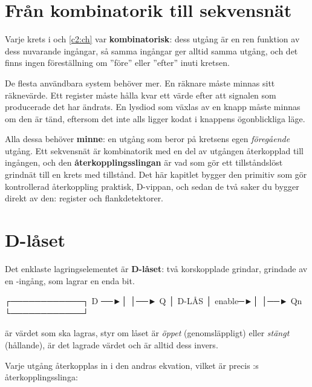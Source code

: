 
\section{Från kombinatorik till sekvensnät}
\label{c3:sec:seq}

Varje krets i  och \ref{c2:ch} var \textbf{kombinatorisk}: dess utgång är en ren
funktion av dess nuvarande ingångar, så samma ingångar ger alltid samma utgång, och det finns
ingen föreställning om ”före” eller ”efter” inuti kretsen.

De flesta användbara system behöver mer. En räknare måste minnas sitt räknevärde. Ett register
måste hålla kvar ett värde efter att signalen som producerade det har ändrats. En lysdiod som
växlas av en knapp måste minnas om den är tänd, eftersom det inte alls ligger kodat i knappens
ögonblickliga läge.

Alla dessa behöver \textbf{minne}: en utgång som beror på kretsens egen \emph{föregående} utgång.
Ett sekvensnät är kombinatorik med en del av utgången återkopplad till ingången, och den
\textbf{återkopplingsslingan} är vad som gör ett tillståndslöst grindnät till en krets med
tillstånd. Det här kapitlet bygger den primitiv som gör kontrollerad återkoppling praktisk,
D-vippan, och sedan de två saker du bygger direkt av den: register och flankdetektorer.

\section{D-låset}
\label{c3:sec:latch}

Det enklaste lagringselementet är \textbf{D-låset}: två korskopplade grindar, grindade av en
-ingång, som lagrar en enda bit.

\begin{textdrawing}
        ┌────────────┐
   D ──►│            │──► Q
        │   D-LÅS    │
enable─►│            │──► Qn
        └────────────┘
\end{textdrawing}

 är värdet som ska lagras,  styr om låset är \emph{öppet} (genomsläppligt)
eller \emph{stängt} (hållande),  är det lagrade värdet och  är alltid dess invers.

Varje utgång återkopplas in i den andras ekvation, vilket är precis :s
återkopplingsslinga:

